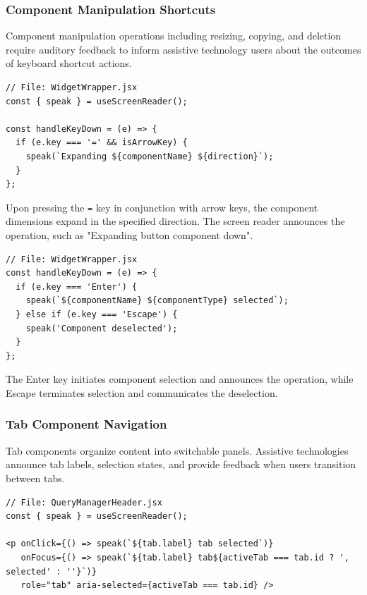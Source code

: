 \subsubsection{Component Manipulation Shortcuts}

Component manipulation operations including resizing, copying, and deletion require auditory feedback to inform assistive technology users about the outcomes of keyboard shortcut actions.

\begin{lstlisting}[caption={Component resize announcements}, label={lst:resize-sr}]
// File: WidgetWrapper.jsx
const { speak } = useScreenReader();

const handleKeyDown = (e) => {
  if (e.key === '=' && isArrowKey) {
    speak(`Expanding ${componentName} ${direction}`);
  }
};
\end{lstlisting}

Upon pressing the \texttt{=} key in conjunction with arrow keys, the component dimensions expand in the specified direction. The screen reader announces the operation, such as "Expanding button component down".

\begin{lstlisting}[caption={Component selection announcements}, label={lst:selection-sr}]
// File: WidgetWrapper.jsx
const handleKeyDown = (e) => {
  if (e.key === 'Enter') {
    speak(`${componentName} ${componentType} selected`);
  } else if (e.key === 'Escape') {
    speak('Component deselected');
  }
};
\end{lstlisting}

The Enter key initiates component selection and announces the operation, while Escape terminates selection and communicates the deselection.

\subsubsection{Tab Component Navigation}

Tab components organize content into switchable panels. Assistive technologies announce tab labels, selection states, and provide feedback when users transition between tabs.

\begin{lstlisting}[caption={Tab navigation with screen reader support}, label={lst:tabs-sr}]
// File: QueryManagerHeader.jsx
const { speak } = useScreenReader();

<p onClick={() => speak(`${tab.label} tab selected`)}
   onFocus={() => speak(`${tab.label} tab${activeTab === tab.id ? ', selected' : ''}`)}
   role="tab" aria-selected={activeTab === tab.id} />
\end{lstlisting}

